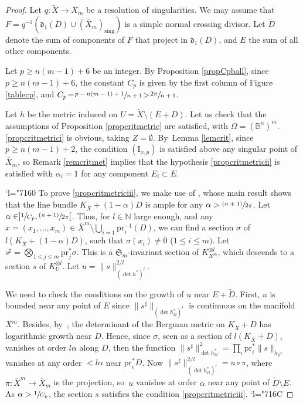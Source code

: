 \documentclass[JEP,XML,SOM,Unicode, NoEqCountersInSection,NoFloatCountersInSection,published]{cedram}
\newcommand{\Changel}{\mathcode`l="7160}
\newcommand{\Changelback}{\mathcode`l="716C}
\newcommand{\psfrac}[2]{\sfrac{(#1)}{#2}}
\newcommand{\rI}{\mathrm{I}}
\newcommand{\pr}{\mathrm{pr}}
\newcommand{\sing}{\mathrm{sing}}
\theoremstyle{theorem}
\theoremstyle{definition}
\begin{document}
\begin{proof}
Let $q : \widetilde{X} \to \overline{X}_m$ be a resolution of singularities. We may assume that $F = q^{-1}(\mathfrak{d}_1(D) \cup (\overline{X}_m)_{\sing})$ is a simple normal crossing divisor. Let $\widetilde{D}$ denote the sum of components of $F$ that project in $ \mathfrak{d}_1(D)$, and $E$ the sum of all other components.

Let $p \!\geq\! n(m - 1) + 6$ be an integer. By Proposition \ref{propCpball}, since $p \!\geq\! n(m-1) + 6$, the constant $C_p$ is given by the first column of Figure \ref{tablecp}, and $C_p \!=\! \sfrac{p - n(m-1) + 1}{n+1} \!>\! \sfrac{2\pi}{n+1}$.

Let $h$ be the metric induced on $U = \widetilde{X} \setminus (E + D)$. Let us check that the assumptions of Proposition \ref{propcritmetric} are satisfied, with $\Omega = (\mathbb B^n)^m$. \eqref{propcritmetrici} is obvious, taking $Z = \emptyset$. By~Lemma \ref{lemcrit}, since $p \geq n(m-1) + 2$, the condition $(\rI_{x, p})$ is satisfied above any singular point of $\overline{X}_m$, so Remark \ref{remcritmet} implies that the hypothesis \eqref{propcritmetricii} is satisfied with $\alpha_i = 1$ for any component $E_i \subset E$.

\Changel
To prove \eqref{propcritmetriciii}, we make use of \cite{BT18}, whose main result shows that the line bundle $K_{\overline{X}} + (1 - \alpha) D$ is ample for any $\alpha > \psfrac{n+1}{2\pi}$. Let $\alpha \in ] \sfrac{1}{C_p}, \psfrac{n+1}{2\pi}[$. Thus, for $l \in \mathbb N$ large enough, and any $x = (x_1,\dots, x_m) \in \overline{X}^m \setminus \bigcup_{i = 1} \pr_i^{-1}(D)$, we can find a section $\sigma$ of $l \left( K_{\overline{X}} + (1 - \alpha) D\right)$, such that $\sigma(x_i) \neq 0$ ($1 \leq i \leq m)$. Let $s^\sharp = \bigotimes_{1 \leq j \leq m} \pr_j^\ast \sigma$. This is a $\mathfrak{S}_m$-invariant section of $K_{X^m}^{\otimes l}$, which descends to a section $s$ of $K_{U}^{\otimes l}$. Let $u = \| s \|^{2/l}_{(\det h^\ast)^l}$.

We need to check the conditions on the growth of $u$ near $E + \widetilde{D}$. First, $u$ is bounded near any point of $E$ since $\| s^{\sharp}\|_{(\det h_{\Omega}^\ast)^l}$ is continuous on the manifold $X^m$. Besides, by~\cite[Th.\,3.1 \& Prop.\,3.4(b)]{mum77}, the determinant of the Bergman metric on $K_{\overline{X}}\!+\!D$ has logarithmic growth near $D$. Hence, since $\sigma$, seen as a section of $l(K_{\overline{X}} + D)$, vanishes at order $l \alpha$ along $D$, then the function $\| s^{\sharp} \|_{\det h_{\Omega}^\ast}^{2} = \prod_i \pr_i^\ast \|s\|_{h_{\mathbb B^n}}$ vanishes at any order $< l \alpha$ near $\pr_i^{\ast} D$. Now $\| s^\sharp\|_{(\det h_{\Omega}^\ast)^l}^{2/l} = u \circ \pi$, where $\pi : \overline{X}^m \to \overline{X}_m$ is the projection, so~$u$ vanishes at order $\alpha$ near any point of $\widetilde{D} \setminus E$. As $\alpha > \sfrac{1}{C_p}$, the section $s$ satisfies the condition \eqref{propcritmetriciii}.
\Changelback


\end{proof}
\end{document}
